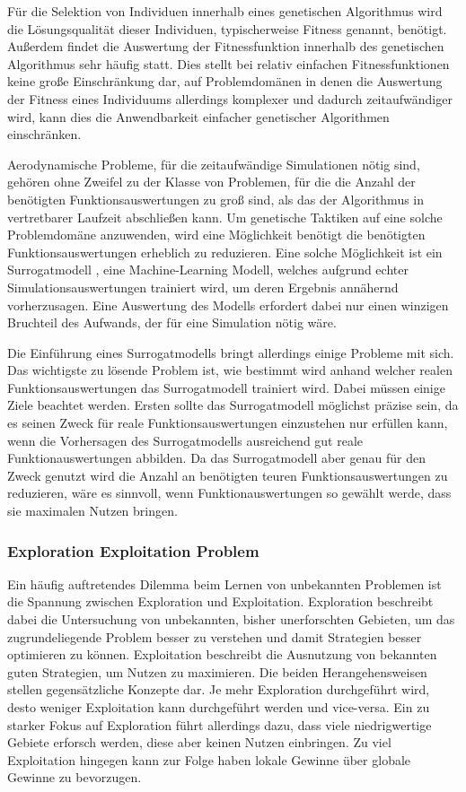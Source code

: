 \label{sub:surrogate}
Für die Selektion von Individuen innerhalb eines genetischen Algorithmus wird die Lösungsqualität dieser Individuen, typischerweise Fitness genannt, benötigt.
Außerdem findet die Auswertung der Fitnessfunktion innerhalb des genetischen Algorithmus sehr häufig statt.
Dies stellt bei relativ einfachen Fitnessfunktionen keine große Einschränkung dar, auf Problemdomänen in denen die Auswertung der Fitness eines Individuums allerdings komplexer und dadurch zeitaufwändiger wird, kann dies die Anwendbarkeit einfacher genetischer Algorithmen einschränken.

Aerodynamische Probleme, für die zeitaufwändige Simulationen nötig sind, gehören ohne Zweifel zu der Klasse von Problemen, für die die Anzahl der benötigten Funktionsauswertungen zu groß sind, als das der Algorithmus in vertretbarer Laufzeit abschließen kann.
Um genetische Taktiken auf eine solche Problemdomäne anzuwenden, wird eine Möglichkeit benötigt die benötigten Funktionsauswertungen erheblich zu reduzieren.
Eine solche Möglichkeit ist ein Surrogatmodell \cite{Jin.2011}\cite{Preen.2016}, eine Machine-Learning Modell, welches aufgrund echter Simulationsauswertungen trainiert wird, um deren Ergebnis annähernd vorherzusagen.
Eine Auswertung des Modells erfordert dabei nur einen winzigen Bruchteil des Aufwands, der für eine Simulation nötig wäre.

Die Einführung eines Surrogatmodells bringt allerdings einige Probleme mit sich.
Das wichtigste zu lösende Problem ist, wie bestimmt wird anhand welcher realen Funktionsauswertungen das Surrogatmodell trainiert wird.
Dabei müssen einige Ziele beachtet werden.
Ersten sollte das Surrogatmodell möglichst präzise sein, da es seinen Zweck für reale Funktionsauswertungen einzustehen nur erfüllen kann, wenn die Vorhersagen des Surrogatmodells ausreichend gut reale Funktionauswertungen abbilden.
Da das Surrogatmodell aber genau für den Zweck genutzt wird die Anzahl an benötigten teuren Funktionsauswertungen zu reduzieren, wäre es sinnvoll, wenn Funktionauswertungen so gewählt werde, dass sie maximalen Nutzen bringen.

\subsubsection{Exploration Exploitation Problem}

Ein häufig auftretendes Dilemma beim Lernen von unbekannten Problemen ist die Spannung zwischen Exploration und Exploitation.
Exploration beschreibt dabei die Untersuchung von unbekannten, bisher unerforschten Gebieten, um das zugrundeliegende Problem besser zu verstehen und damit Strategien besser optimieren zu können.
Exploitation beschreibt die Ausnutzung von bekannten guten Strategien, um Nutzen zu maximieren.
Die beiden Herangehensweisen stellen gegensätzliche Konzepte dar.
Je mehr Exploration durchgeführt wird, desto weniger Exploitation kann durchgeführt werden und vice-versa.
Ein zu starker Fokus auf Exploration führt allerdings dazu, dass viele niedrigwertige Gebiete erforsch werden, diese aber keinen Nutzen einbringen.
Zu viel Exploitation hingegen kann zur Folge haben lokale Gewinne über globale Gewinne zu bevorzugen.

